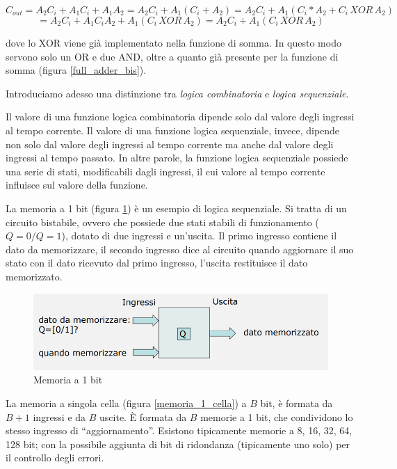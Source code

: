 \documentclass{article}
\begin{document}
\[C_{out} = A_2 C_i + A_1 C_i + A_1 A_2 = A_2 C_i + A_1 (C_i + A_2) =  A_2 C_i + A_1 (C_i * A_2 + C_i \, XOR \, A_2)\] 
\[= A_2 C_i + A_1 C_i A_2 + A_1 (C_i \, XOR \, A_2) = A_2 C_i + A_1 (C_i \, XOR \, A_2)\]

dove lo XOR viene già implementato nella funzione di somma. In questo modo servono solo un OR e due AND, oltre a quanto già presente per la funzione di somma (figura \ref{full_adder_bis}).

\vspace{3mm}

Introduciamo adesso una distinzione tra \textit{logica combinatoria} e \textit{logica sequenziale}.

\vspace{3mm}

Il valore di una funzione logica combinatoria dipende solo dal valore degli ingressi al tempo corrente. Il valore di una funzione logica sequenziale, invece, dipende non solo dal valore degli ingressi al tempo corrente ma anche dal valore degli ingressi al tempo passato. In altre parole, la funzione logica sequenziale possiede una serie di stati, modificabili dagli ingressi, il cui valore al tempo corrente influisce sul valore della funzione.

\vspace{3mm}

La memoria a 1 bit (figura \ref{memoria_1_bit}) è un esempio di logica sequenziale. Si tratta di un circuito bistabile, ovvero che possiede due stati stabili di funzionamento ($Q = 0 / Q = 1$), dotato di due ingressi e un'uscita. Il primo ingresso contiene il dato da memorizzare, il secondo ingresso dice al circuito quando aggiornare il suo stato con il dato ricevuto dal primo ingresso, l'uscita restituisce il dato memorizzato.

\begin{figure}[h]
  \centering
  \includegraphics[scale=0.7]{IM_memoria_1_bit}
  \caption{Memoria a 1 bit}
  \label{memoria_1_bit}
\end{figure}
\clearpage
La memoria a singola cella (figura \ref{memoria_1_cella}) a $B$ bit, è formata da $B + 1$ ingressi e da $B$ uscite. È formata da $B$ memorie a 1 bit, che condividono lo stesso ingresso di ``aggiornamento''. Esistono tipicamente memorie a 8, 16, 32, 64, 128 bit; con la possibile aggiunta di bit di ridondanza (tipicamente uno solo) per il controllo degli errori.
\end{document}
